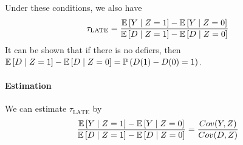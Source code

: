 Under these conditions, we also have \begin{equation*}
    \tau_{\text{LATE}} = \frac{\mathbb{E}\left[Y \mid Z=1\right]-\mathbb{E}\left[Y\mid Z=0\right]}{\mathbb{E}\left[D\mid Z=1\right]-\mathbb{E}\left[D\mid Z=0\right]}
\end{equation*}
It can be shown that if there is no defiers, then $\mathbb{E}\left[D\mid Z=1\right]-\mathbb{E}\left[D\mid Z=0\right] = \mathbb{P}\left(D(1)-D(0)=1\right)$.

\paragraph{Estimation}
We can estimate $\tau_{\text{LATE}}$ by \begin{equation*}
    \frac{\mathbb{E}\left[Y \mid Z=1\right]-\mathbb{E}\left[Y\mid Z=0\right]}{\mathbb{E}\left[D\mid Z=1\right]-\mathbb{E}\left[D\mid Z=0\right]}=\frac{Cov(Y,Z)}{Cov(D,Z)}
\end{equation*}


